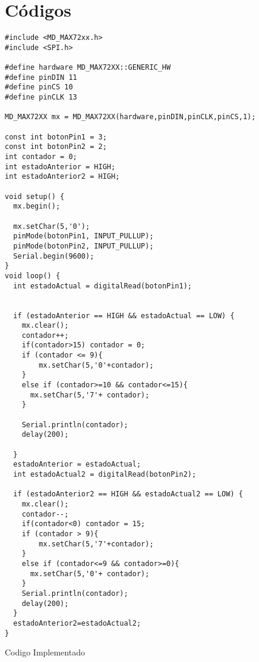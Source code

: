 \section{Códigos}

\begin{listing}[H]
  \scriptsize
  \begin{verbatim}
#include <MD_MAX72xx.h>
#include <SPI.h>

#define hardware MD_MAX72XX::GENERIC_HW
#define pinDIN 11
#define pinCS 10
#define pinCLK 13

MD_MAX72XX mx = MD_MAX72XX(hardware,pinDIN,pinCLK,pinCS,1);

const int botonPin1 = 3;  
const int botonPin2 = 2;
int contador = 0;         
int estadoAnterior = HIGH; 
int estadoAnterior2 = HIGH;

void setup() {
  mx.begin();
  
  mx.setChar(5,'0');
  pinMode(botonPin1, INPUT_PULLUP); 
  pinMode(botonPin2, INPUT_PULLUP);
  Serial.begin(9600);
}
void loop() {
  int estadoActual = digitalRead(botonPin1);
  

  if (estadoAnterior == HIGH && estadoActual == LOW) {
    mx.clear();
    contador++;
    if(contador>15) contador = 0;
    if (contador <= 9){
        mx.setChar(5,'0'+contador);
    }
    else if (contador>=10 && contador<=15){
      mx.setChar(5,'7'+ contador);
    }
    
    Serial.println(contador);
    delay(200); 
    
  }
  estadoAnterior = estadoActual; 
  int estadoActual2 = digitalRead(botonPin2);
 
  if (estadoAnterior2 == HIGH && estadoActual2 == LOW) {
    mx.clear();
    contador--;
    if(contador<0) contador = 15;
    if (contador > 9){
        mx.setChar(5,'7'+contador);
    }
    else if (contador<=9 && contador>=0){
      mx.setChar(5,'0'+ contador);
    }
    Serial.println(contador);
    delay(200); 
  }
  estadoAnterior2=estadoActual2;
}
  \end{verbatim}
  \caption{Codigo Implementado}
  \label{lst:cod-1}
\end{listing}
